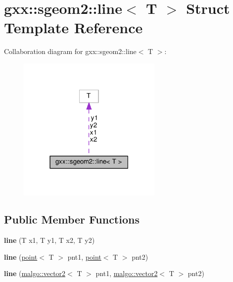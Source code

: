 \hypertarget{structgxx_1_1sgeom2_1_1line}{}\section{gxx\+:\+:sgeom2\+:\+:line$<$ T $>$ Struct Template Reference}
\label{structgxx_1_1sgeom2_1_1line}


Collaboration diagram for gxx\+:\+:sgeom2\+:\+:line$<$ T $>$\+:
\nopagebreak
\begin{figure}[H]
\begin{center}
\leavevmode
\includegraphics[width=198pt]{structgxx_1_1sgeom2_1_1line__coll__graph}
\end{center}
\end{figure}
\subsection*{Public Member Functions}
\begin{DoxyCompactItemize}
\item 
{\bfseries line} (T x1, T y1, T x2, T y2)\hypertarget{structgxx_1_1sgeom2_1_1line_aaccf6f428ed7c1ef910f65c87e0684db}{}\label{structgxx_1_1sgeom2_1_1line_aaccf6f428ed7c1ef910f65c87e0684db}

\item 
{\bfseries line} (\hyperlink{structgxx_1_1sgeom2_1_1point}{point}$<$ T $>$ pnt1, \hyperlink{structgxx_1_1sgeom2_1_1point}{point}$<$ T $>$ pnt2)\hypertarget{structgxx_1_1sgeom2_1_1line_aca58c8c6e2c80a8dceda31e467704dfc}{}\label{structgxx_1_1sgeom2_1_1line_aca58c8c6e2c80a8dceda31e467704dfc}

\item 
{\bfseries line} (\hyperlink{classmalgo_1_1vector2}{malgo\+::vector2}$<$ T $>$ pnt1, \hyperlink{classmalgo_1_1vector2}{malgo\+::vector2}$<$ T $>$ pnt2)\hypertarget{structgxx_1_1sgeom2_1_1line_a04895470393b743009cc7b9981407a3b}{}\label{structgxx_1_1sgeom2_1_1line_a04895470393b743009cc7b9981407a3b}

\end{DoxyCompactItemize}
